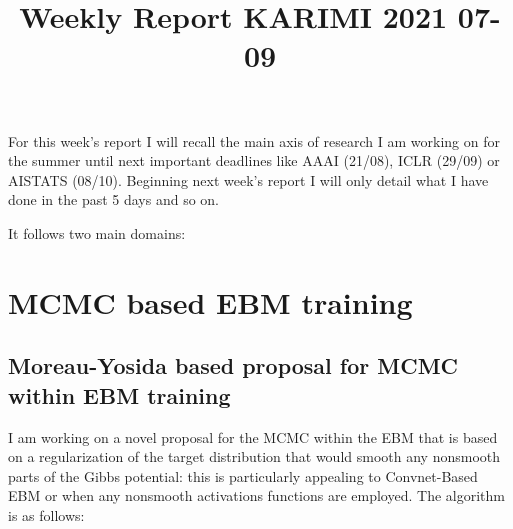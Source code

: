 \documentclass{article}
\begin{document}
\title{Weekly Report KARIMI 2021 07-09}


\date{}
\maketitle

For this week's report I will recall the main axis of research I am working on for the summer until next important deadlines like AAAI (21/08), ICLR (29/09) or AISTATS (08/10).
Beginning next week's report I will only detail what I have done in the past 5 days and so on.

It follows two main domains:

\section{MCMC based EBM training}


\subsection{Moreau-Yosida based proposal for MCMC within EBM training}
I am working on a novel proposal for the MCMC within the EBM that is based on a regularization of the target distribution that would smooth any nonsmooth parts of the Gibbs potential: this is particularly appealing to Convnet-Based EBM or when any nonsmooth activations functions are employed.
The algorithm is as follows:
\end{document}
